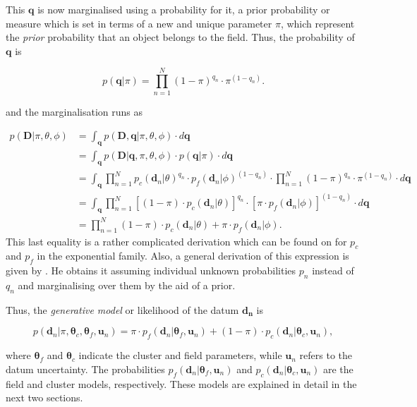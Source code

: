 This $\mathbf{q}$ is now marginalised using a probability for it, a prior probability or measure which is set in terms of a new and unique parameter $\pi$, which represent the \emph{prior} probability that an object belongs to the field. Thus, the probability of $\mathbf{q}$ is

\begin{equation}
p(\mathbf{q}|\pi)= \prod_{n=1}^N {(1-\pi)}^{q_n}\cdot {\pi}^{(1-q_n)}.
\end{equation}

and the marginalisation runs as

\begin{align}
p(\mathbf{D}|\pi,\theta,\phi)&=\int_{\mathbf{q}} p(\mathbf{D},\mathbf{q}|\pi,\theta,\phi)\cdot d\mathbf{q} \nonumber \\
&=\int_{\mathbf{q}} p(\mathbf{D}|\mathbf{q},\pi,\theta,\phi)\cdot p(\mathbf{q}|\pi)\cdot d\mathbf{q} \nonumber \\
&=\int_{\mathbf{q}} \prod_{n=1}^N {p_c(\mathbf{d}_n|\theta)}^{q_n}\cdot {p_f(\mathbf{d}_n|\phi)}^{(1-q_n)}\cdot \prod_{n=1}^N {(1-\pi)}^{q_n}\cdot {\pi}^{(1-q_n)}\cdot d\mathbf{q} \nonumber \\
&=\int_{\mathbf{q}} \prod_{n=1}^N \left[(1-\pi)\cdot p_c(\mathbf{d}_n|\theta)\right]^{q_n}\cdot \left[\pi\cdot p_f(\mathbf{d}_n|\phi)\right]^{(1-q_n)}\cdot d\mathbf{q} \nonumber \\
&=\prod_{n=1}^N (1-\pi)\cdot p_c(\mathbf{d}_n|\theta) + \pi\cdot p_f(\mathbf{d}_n|\phi).
\end{align}
This last equality is a rather complicated derivation which can be found on \citet{Press1997,Hogg2010a} for $p_c$ and $p_f$ in the exponential family. Also, a general derivation of this expression is given by \citet{Jaynes2003}. He obtains it assuming individual unknown probabilities $p_n$ instead of $q_n$ and marginalising over them by the aid of a prior.

Thus, the \emph{generative model} or likelihood of the datum $\mathbf{d_n}$  is

\begin{equation}
\label{eq:genmod}
p(\mathbf{d}_n | \pi,\boldsymbol{\theta}_c,\boldsymbol{\theta}_f,\mathbf{u}_n)=\pi \cdot p_f(\mathbf{d}_n|\boldsymbol{\theta}_f,\mathbf{u}_n) + (1-\pi)\cdot p_c(\mathbf{d}_n| \boldsymbol{\theta}_c,\mathbf{u}_n),
\end{equation}

where $\boldsymbol{\theta}_f$ and $\boldsymbol{\theta}_c$ indicate the cluster and field parameters, while $\mathbf{u}_n$ refers to the datum uncertainty. The probabilities $p_f(\mathbf{d}_n|\boldsymbol{\theta}_f,\mathbf{u}_n)$ and $p_c(\mathbf{d}_n| \boldsymbol{\theta}_c,\mathbf{u}_n)$ are the field and cluster models, respectively. These models are explained in detail in the next two sections.

